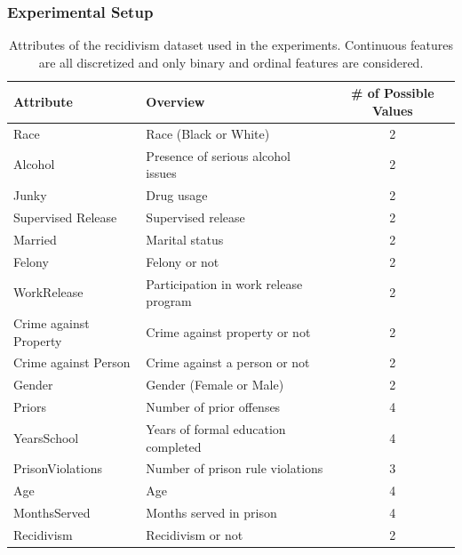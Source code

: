 \documentclass[runningheads]{llncs}
\begin{document}
\subsubsection{Experimental Setup}\label{sec:exp_setting}
{%
  \renewcommand{\arraystretch}{1.05}
  \begin{table}[tbp]
    \centering
    \caption{%
      Attributes of the recidivism dataset used in the experiments.
      Continuous features are all discretized
      and only binary and ordinal features are considered.
    }\label{tab:rcdv}
    \begin{tabular}{llc}
      \toprule
      Attribute              & Overview                              & \# of Possible Values \\
      \midrule
      Race                   & Race (Black or White)                 & 2                     \\
      Alcohol                & Presence of serious alcohol issues    & 2                     \\
      Junky                  & Drug usage                            & 2                     \\
      Supervised Release     & Supervised release                    & 2                     \\
      Married                & Marital status                        & 2                     \\
      Felony                 & Felony or not                         & 2                     \\
      WorkRelease            & Participation in work release program & 2                     \\
      Crime against Property & Crime against property or not         & 2                     \\
      Crime against Person   & Crime against a person or not         & 2                     \\
      Gender                 & Gender (Female or Male)               & 2                     \\
      Priors                 & Number of prior offenses              & 4                     \\
      YearsSchool            & Years of formal education completed   & 4                     \\
      PrisonViolations       & Number of prison rule violations      & 3                     \\
      Age                    & Age                                   & 4                     \\
      MonthsServed           & Months served in prison               & 4                     \\
      \midrule
      Recidivism             & Recidivism or not                     & 2                     \\
      \bottomrule
    \end{tabular}
  \end{table}
}
\end{document}
